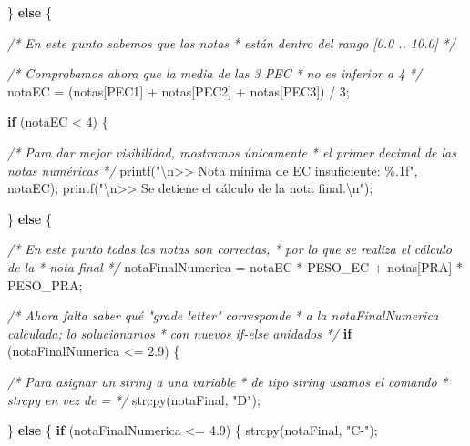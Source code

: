\documentclass[
]{book}
\newenvironment{Shaded}{\begin{snugshade}}{\end{snugshade}}
\newcommand{\CommentTok}[1]{\textcolor[rgb]{0.56,0.35,0.01}{\textit{#1}}}
\newcommand{\ControlFlowTok}[1]{\textcolor[rgb]{0.13,0.29,0.53}{\textbf{#1}}}
\newcommand{\DecValTok}[1]{\textcolor[rgb]{0.00,0.00,0.81}{#1}}
\newcommand{\FloatTok}[1]{\textcolor[rgb]{0.00,0.00,0.81}{#1}}
\newcommand{\NormalTok}[1]{#1}
\newcommand{\SpecialCharTok}[1]{\textcolor[rgb]{0.00,0.00,0.00}{#1}}
\newcommand{\StringTok}[1]{\textcolor[rgb]{0.31,0.60,0.02}{#1}}
\begin{document}
\begin{Shaded}
\begin{Highlighting}[]
\NormalTok{    \} }\ControlFlowTok{else}\NormalTok{ \{}

        \CommentTok{/* En este punto sabemos que las notas}
\CommentTok{         * están dentro del rango [0.0 .. 10.0]}
\CommentTok{         */}

        \CommentTok{/* Comprobamos ahora que la media de las 3 PEC}
\CommentTok{         * no es inferior a 4}
\CommentTok{         */}
\NormalTok{        notaEC = (notas[PEC1] + notas[PEC2] + notas[PEC3]) / }\DecValTok{3}\NormalTok{;}

        \ControlFlowTok{if}\NormalTok{ (notaEC \textless{} }\DecValTok{4}\NormalTok{) \{}

           \CommentTok{/* Para dar mejor visibilidad, mostramos únicamente}
\CommentTok{            * el primer decimal de las notas numéricas}
\CommentTok{            */}
\NormalTok{           printf(}\StringTok{"}\SpecialCharTok{\textbackslash{}n}\StringTok{\textgreater{}\textgreater{} Nota mínima de EC insuficiente: \%.1f"}\NormalTok{, notaEC);}
\NormalTok{           printf(}\StringTok{"}\SpecialCharTok{\textbackslash{}n}\StringTok{\textgreater{}\textgreater{} Se detiene el cálculo de la nota final.}\SpecialCharTok{\textbackslash{}n}\StringTok{"}\NormalTok{);}

\NormalTok{        \} }\ControlFlowTok{else}\NormalTok{ \{}

            \CommentTok{/* En este punto todas las notas son correctas,}
\CommentTok{             * por lo que se realiza el cálculo de la}
\CommentTok{             * nota final}
\CommentTok{             */}
\NormalTok{            notaFinalNumerica = notaEC * PESO\_EC + notas[PRA] * PESO\_PRA;}

            \CommentTok{/* Ahora falta saber qué "grade letter" corresponde}
\CommentTok{             * a la notaFinalNumerica calculada; lo solucionamos}
\CommentTok{             * con nuevos if{-}else anidados}
\CommentTok{             */}
            \ControlFlowTok{if}\NormalTok{ (notaFinalNumerica \textless{}= }\FloatTok{2.9}\NormalTok{) \{}

                \CommentTok{/* Para asignar un string a una variable}
\CommentTok{                 * de tipo string usamos el comando}
\CommentTok{                 * strcpy en vez de \textquotesingle{}=\textquotesingle{}}
\CommentTok{                 */}
\NormalTok{                strcpy(notaFinal, }\StringTok{"D"}\NormalTok{);}

\NormalTok{            \} }\ControlFlowTok{else}\NormalTok{ \{}
                \ControlFlowTok{if}\NormalTok{ (notaFinalNumerica \textless{}= }\FloatTok{4.9}\NormalTok{) \{}
\NormalTok{                    strcpy(notaFinal, }\StringTok{"C{-}"}\NormalTok{);}


\end{Highlighting}
\end{Shaded}
\end{document}
